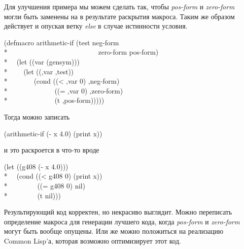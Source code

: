 \begin{defmac}
Для улучшения примера мы можем сделать так, чтобы \emph{pos-form} и
\emph{zero-form} могли быть заменены на {\nil} в результате раскрытия макроса.
Таким же образом действует и  опуская ветку \emph{else} в случае
истинности условия.
\begin{lisp}
(defmacro arithmetic-if (test neg-form \\*
~~~~~~~~~~~~~~~~~~~~~~~~~ zero-form pos-form) \\*
~~(let ((var (gensym))) \\*
~~~~{\Xbq}(let ((,var ,test)) \\*
~~~~~~~(cond ((< ,var 0) ,neg-form) \\*
~~~~~~~~~~~~~((= ,var 0) ,zero-form) \\*
~~~~~~~~~~~~~(t ,pos-form)))))
\end{lisp}
Тогда можно записать
\begin{lisp}
(arithmetic-if (- x 4.0) (print x))
\end{lisp}
и это раскроется в что-то вроде
\begin{lisp}
(let ((g408 (- x 4.0))) \\*
~~(cond ((< g408 0) (print x)) \\*
~~~~~~~~((= g408 0) nil) \\*
~~~~~~~~(t nil)))
\end{lisp}
Результирующий код корректен, но некрасиво выглядит.
Можно переписать определение макроса для генерации лучшего кода, когда
\emph{pos-form} и \emph{zero-form} могут быть вообще опущены.
Или же можно положиться на реализацию Common Lisp'а, которая возможно
оптимизирует этот код.


\end{defmac}
